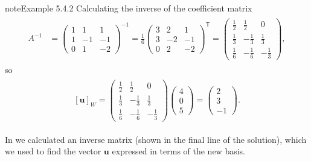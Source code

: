 \documentclass[letterpaper,10pt,english]{jupyterBook}
\begin{document}
\begin{sphinxadmonition}{note}{Example 5.4.2}
\sphinxAtStartPar
Calculating the inverse of the coefficient matrix
\begin{equation*}
\begin{split} \begin{align*}
    A^{-1} &=
    \begin{pmatrix}
        1 & 1 & 1 \\
        1 & -1 & -1 \\
        0 & 1 & -2
    \end{pmatrix}^{-1}
    =
    \frac{1}{6}
    \begin{pmatrix}
        3 & 2 & 1 \\
        3 & -2 & -1 \\
        0 & 2 & -2
    \end{pmatrix}^\mathsf{T}
    =
    \begin{pmatrix}
        \frac{1}{2} & \frac{1}{2} & 0 \\
        \frac{1}{3} & -\frac{1}{3} & \frac{1}{3} \\
        \frac{1}{6} & -\frac{1}{6} & -\frac{1}{3}
    \end{pmatrix},
\end{align*} \end{split}
\end{equation*}
\sphinxAtStartPar
so
\begin{equation*}
\begin{split} \begin{align*}
    [\mathbf{u}]_W =
    \begin{pmatrix}
        \frac{1}{2} & \frac{1}{2} & 0 \\
        \frac{1}{3} & -\frac{1}{3} & \frac{1}{3} \\
        \frac{1}{6} & -\frac{1}{6} & -\frac{1}{3}
    \end{pmatrix}
    \begin{pmatrix} 4 \\ 0 \\ 5 \end{pmatrix} =
    \begin{pmatrix} 2 \\ 3 \\ -1 \end{pmatrix}.
\end{align*} \end{split}
\end{equation*}\end{sphinxadmonition}

\sphinxAtStartPar
In {\hyperref[\detokenize{_pages/5.4_Basis:change-of-basis-example}]{}} we calculated an inverse matrix (shown in the final line of the solution), which we used to find the vector \(\mathbf{u}\) expressed in terms of the new basis.
\end{document}
